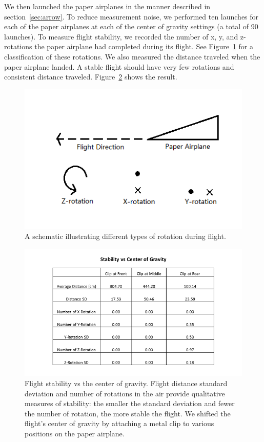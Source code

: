 We then launched the paper airplanes in the manner described in section~\ref{sec:arrow}. To reduce measurement noise, we performed ten launches for each of the paper airplanes at each of the center of gravity settings (a total of 90 launches). To measure flight stability, we recorded the number of x, y, and z-rotations the paper airplane had completed during its flight. See Figure~\ref{fig:rotation} for a classification of these rotations. We also measured the distance traveled when the paper airplane landed. A stable flight should have very few rotations and consistent distance traveled. Figure~\ref{fig:centerofgravity} shows the result. 

\begin{figure}[hl]
	\centering
		\includegraphics[scale=0.8]{figures/rotation.png}
		\caption{A schematic illustrating different types of rotation during flight.}
	\label{fig:rotation}
\end{figure}

\begin{figure}[hl]
	\centering
		\includegraphics[scale=0.7]{figures/centerofgravity.png}
		\caption{Flight stability vs the center of gravity. Flight distance standard deviation and number of rotations in the air provide qualitative measures of stability: the smaller the standard deviation and fewer the number of rotation, the more stable the flight. We shifted the flight's center of gravity by attaching a metal clip to various positions on the paper airplane.}
	\label{fig:centerofgravity}
\end{figure}

